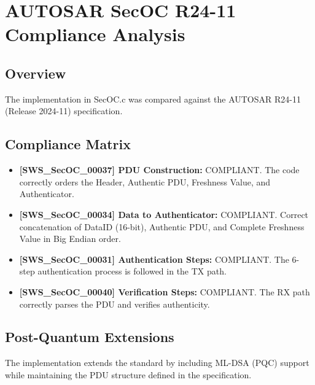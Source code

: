 \section{AUTOSAR SecOC R24-11 Compliance Analysis}
\subsection{Overview}
The implementation in SecOC.c was compared against the AUTOSAR R24-11 (Release 2024-11) specification.

\subsection{Compliance Matrix}
\begin{itemize}
    \item \textbf{[SWS_SecOC_00037] PDU Construction:} COMPLIANT. The code correctly orders the Header, Authentic PDU, Freshness Value, and Authenticator.
    \item \textbf{[SWS_SecOC_00034] Data to Authenticator:} COMPLIANT. Correct concatenation of DataID (16-bit), Authentic PDU, and Complete Freshness Value in Big Endian order.
    \item \textbf{[SWS_SecOC_00031] Authentication Steps:} COMPLIANT. The 6-step authentication process is followed in the TX path.
    \item \textbf{[SWS_SecOC_00040] Verification Steps:} COMPLIANT. The RX path correctly parses the PDU and verifies authenticity.
\end{itemize}

\subsection{Post-Quantum Extensions}
The implementation extends the standard by including ML-DSA (PQC) support while maintaining the PDU structure defined in the specification.